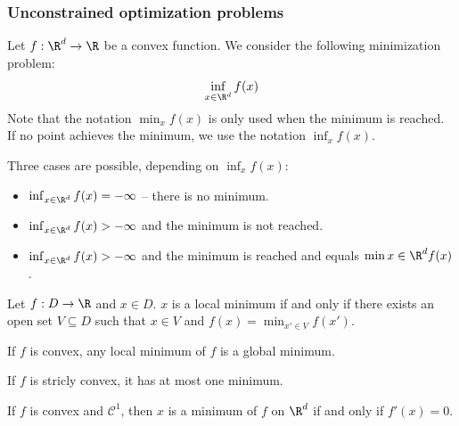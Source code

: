 \documentclass{../cs-classes/cs-classes}
\begin{document}
\subsubsection{Unconstrained optimization problems}
Let $f:\R^d\to\R$ be a convex function. We consider the following minimization problem:
\begin{equation*}
    \inf_{x\in\R^d}f(x)
\end{equation*}
Note that the notation $\min_x f(x)$ is only used when the minimum is reached. If no point achieves the minimum, we use the notation $\inf_xf(x)$.

Three cases are possible, depending on $\inf_xf(x)$:
\begin{itemize}
    \item $\inf_{x\in\R^d}f(x)=-\infty$ -- there is no minimum.
    \item $\inf_{x\in\R^d}f(x)>-\infty$ and the minimum is not reached.
    \item $\inf_{x\in\R^d}f(x)>-\infty$ and the minimum is reached and equals $\min{x\in\R^d}f(x)$.
\end{itemize}

\begin{definition}
    Let $f:D\to\R$ and $x\in D$. $x$ is a local minimum if and only if there exists an open set $V\subseteq D$ such that $x\in V$ and $f(x)=\min_{x'\in V}f(x')$.
\end{definition}

\begin{property}
    \label{prop:local-global-min}
    If $f$ is convex, any local minimum of $f$ is a global minimum.
\end{property}

\begin{property}
    If $f$ is stricly convex, it has at most one minimum.
\end{property}

\begin{property}
    If $f$ is convex and $\mathcal{C}^1$, then $x$ is a minimum of $f$ on $\R^d$ if and only if $f'(x)=0$.
\end{property}
\end{document}
